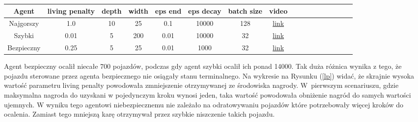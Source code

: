 \documentclass[12pt, oneside]{article}
\begin{document}
\begin{center}
\begin{tabular}{ |c|c|c|c|c|c|c|c|c|c|c|c|c|c|c|c|c| }
\hline
Agent & living penalty & depth & width & eps end & eps decay & batch size& video\\
\hline
Najgorszy & 1.0 & 10 & 25 & 0.1 & 10000 & 128& \href{https://youtu.be/A-l79my3kVg}{link}\\
Szybki& 0.01 & 5 & 200 & 0.01 & 10000 & 32& \href{https://youtu.be/nXtdrKZXq20}{link}\\
Bezpieczny & 0.25 & 5 & 25 & 0.01 & 1000 & 32& \href{https://youtu.be/TNg-FKpZ_yM}{link}\\
\hline
\end{tabular}
\end{center}
Agent bezpieczny ocalił niecałe 700 pojazdów, podczas gdy agent szybki ocalił ich ponad 14000. Tak duża różnica wynika z tego, że pojazdu sterowane przez agenta bezpiecznego nie osiągały stanu terminalnego.
Na wykresie na Rysunku (\ref{lp}) widać, że skrajnie wysoka wartość parametru living penalty powodowała zmniejszenie otrzymywanej ze środowiska nagrody. W~pierwszym scenariuszu, gdzie maksymalna nagroda do uzyskani w pojedynczym kroku wynosi jeden, taka wartość powodowała obniżenie nagród do samych wartości ujemnych. W wyniku tego agentowi niebezpiecznemu nie zależało na odratowywaniu pojazdów które potrzebowały więcej kroków do ocalenia. Zamiast tego mniejszą karę otrzymywał przez szybkie niszczenie takich pojazdu. 
\newpage
\end{document}
